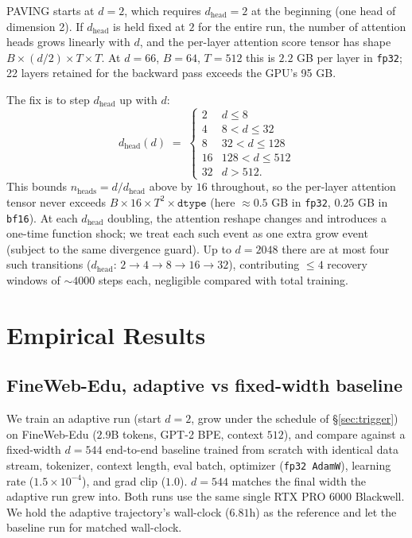 \documentclass{article}
\begin{document}
PAVING starts at $d=2$, which requires $d_{\text{head}}=2$ at the
beginning (one head of dimension 2).  If $d_{\text{head}}$ is held
fixed at $2$ for the entire run, the number of attention heads grows
linearly with $d$, and the per-layer attention score tensor has shape
$B \times (d/2) \times T \times T$.  At $d=66$, $B=64$, $T=512$ this is
$2.2$ GB per layer in \texttt{fp32}; 22 layers retained for the
backward pass exceeds the GPU's 95 GB.

The fix is to step $d_{\text{head}}$ up with $d$:
\begin{equation}
d_{\text{head}}(d) \;=\;
\begin{cases}
2  & d \le 8 \\
4  & 8 < d \le 32 \\
8  & 32 < d \le 128 \\
16 & 128 < d \le 512 \\
32 & d > 512.
\end{cases}
\end{equation}
This bounds $n_{\text{heads}} = d / d_{\text{head}}$ above by $16$
throughout, so the per-layer attention tensor never exceeds
$B \times 16 \times T^2 \times \texttt{dtype}$ (here
$\approx 0.5$ GB in \texttt{fp32}, $0.25$ GB in \texttt{bf16}).  At
each $d_{\text{head}}$ doubling, the attention reshape changes and
introduces a one-time function shock; we treat each such event as one
extra grow event (subject to the same divergence guard).  Up to
$d{=}2048$ there are at most four such transitions
($d_{\text{head}}{:}\,2{\to}4{\to}8{\to}16{\to}32$), contributing
$\le 4$ recovery windows of $\sim 4000$ steps each, negligible
compared with total training.

\section{Empirical Results}
\label{sec:results}

\subsection{FineWeb-Edu, adaptive vs fixed-width baseline}
\label{sec:same-d}

We train an adaptive run (start $d{=}2$, grow under the schedule of
\S\ref{sec:trigger}) on FineWeb-Edu ($2.9$B tokens, GPT-2 BPE,
context $512$), and compare against a fixed-width $d{=}544$
end-to-end baseline trained from scratch with identical data stream,
tokenizer, context length, eval batch, optimizer (\texttt{fp32 AdamW}),
learning rate ($1.5{\times}10^{-4}$), and grad clip ($1.0$).
$d{=}544$ matches the final width the adaptive run grew into.  Both
runs use the same single RTX PRO 6000 Blackwell.  We hold the
adaptive trajectory's wall-clock ($6.81$h) as the reference and let
the baseline run for matched wall-clock.
\end{document}
